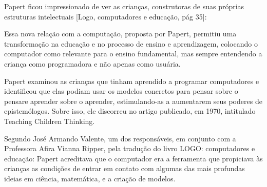 \documentclass[
12pt,		%
openright,	%
twoside,  %
a4paper,			%
chapter=TITLE,		%
english,			%
french,				%
spanish,			%
brazil				%
]{USPSC-classe/USPSC}
\begin{document}
Papert ficou impressionado de ver as crian\c{c}as, construtoras de suas pr\'oprias estruturas intelectuais [Logo, computadores e educa\c{c}\~ao, p\'ag 35]:


















\noindent\begin{center}\mbox{\centering{}}\end{center}


Essa nova rela\c{c}\~ao com a computa\c{c}\~ao, proposta por Papert, permitiu uma transforma\c{c}\~ao na educa\c{c}\~ao e no processo de ensino e aprendizagem, colocando o computador como relevante para o ensino fundamental, mas sempre entendendo a crian\c{c}a como programadora e n\~ao apenas como usu\'aria.

















Papert examinou as crian\c{c}as que tinham aprendido a programar computadores e identificou que elas podiam usar os modelos concretos para \textquotedbl pensar sobre o pensar\textquotedbl  e \textquotedbl aprender sobre o aprender\textquotedbl  [XXX], estimulando-as  a aumentarem seus poderes de epistem\'ologos. Sobre isso, ele discorreu no artigo publicado, em 1970, intitulado Teaching Children Thinking.

















Segundo Jos\'e Armando Valente, um dos respons\'aveis, em conjunto com a Professora Afira Vianna Ripper, pela tradu\c{c}\~ao do livro LOGO: computadores e educa\c{c}\~ao: \textquotedbl Papert acreditava que o computador era a ferramenta que propiciava \`as crian\c{c}as as condi\c{c}\~oes de entrar em contato com algumas das mais profundas ideias em ci\^encia, matem\'atica, e a cria\c{c}\~ao de modelos\textquotedbl .
\end{document}
